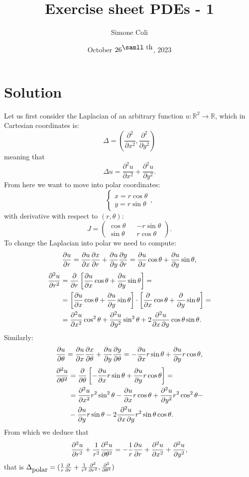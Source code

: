 \documentclass{article}[a4paper]
\title{Exercise sheet PDEs - 1}
\author{Simone Coli}
\date{October $26^{\mbox{\samll th}}$, 2023}
\begin{document}
\maketitle
\section{Solution} %
Let us first consider the Laplacian of an arbitrary function $u : \mathbb{R}^2 \rightarrow \mathbb{R}$, which in Cartesian coordinates is:
\[
    \Delta = \left( \frac{\partial^2}{\partial x^2}, \frac{\partial^2}{\partial y^2} \right)
\]
meaning that
\[
\Delta u = \frac{\partial^2u}{\partial x^2} + \frac{\partial^2u}{\partial y^2}.
\]
From here we want to move into polar coordinates:
\[
    \begin{cases}
        x = r \cos{\theta}\\
        y = r \sin {\theta}
    \end{cases},
\]
with derivative with respect to $(r, \theta)$:
\[
    J =
    \begin{pmatrix}
        \cos {\theta} && -r\sin{\theta}\\
        \sin{\theta} && r\cos{\theta}
    \end{pmatrix}.
\]
To change the Laplacian into polar we need to compute:
\[
    \pdv{u}{r} = \pdv{u}{x}\pdv{x}{r} + 
    \pdv{u}{y} \pdv{y}{r} = \pdv{u}{x}\cos{\theta} + 
    \pdv{u}{y} \sin{\theta},
\]
\[
\begin{split}
    \frac{\partial^2u}{\partial r^2} &= \pdv{}{r}\left[ \pdv{u}{x}\cos{\theta} + 
    \pdv{u}{y} \sin{\theta} \right] =\\
    &= \left[ \pdv{u}{x}\cos{\theta} + 
    \pdv{u}{y} \sin{\theta} \right] \cdot \left[ \pdv{}{x}\cos{\theta} + 
    \pdv{}{y} \sin{\theta} \right] = \\
    &= \frac{\partial^2u}{\partial x^2} \cos^2{\theta} + \frac{\partial^2u}{\partial y^2} \sin^2{\theta} + 2 \pdv{u}{x,y} \cos{\theta} \sin{\theta}.
\end{split}
\]
Similarly:
\[
    \pdv{u}{\theta} = \pdv{u}{x}\pdv{x}{\theta} + 
    \pdv{u}{y} \pdv{y}{\theta} = -\pdv{u}{x}r\sin{\theta} + 
    \pdv{u}{y} r \cos{\theta},
\]
\[
    \begin{split}
        \frac{\partial^2u}{\partial \theta^2} &= \pdv{}{\theta} \left[ -\pdv{u}{x}r\sin{\theta} + 
        \pdv{u}{y} r \cos{\theta} \right] =\\
        &= \frac{\partial^2 u}{\partial x^2} r^2 \sin^2{\theta} - \pdv{u}{x}r \cos{\theta} +\frac{\partial^2u}{\partial y^2} r^2 \cos^2{\theta} -\\
        &- \pdv{u}{y} r \sin{\theta} - 2\pdv{u}{x,y} r^2 \sin{\theta} \cos{\theta}.
    \end{split}
\]
From which we deduce that
\[
    \frac{\partial^2 u}{\partial r^2} + \frac{1}{r^2} \frac{\partial^2 u}{\partial \theta^2} = - \frac{1}{r} \pdv{u}{r} + \frac{\partial^2 u}{\partial x^2} + \frac{\partial^2u}{\partial y^2},
\]
that is $\Delta_{\mbox{polar}} = (\frac{1}{r}\pdv{}{r} + \frac{1}{r^2}\frac{\partial^2}{\partial r^2}, \frac{\partial^2}{\partial \theta^2})$
\end{document}
